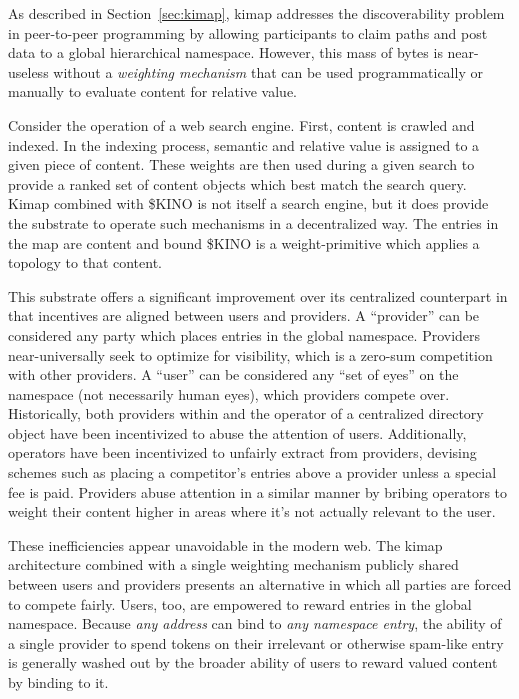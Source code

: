\documentclass[runningheads]{llncs}
\begin{document}
As described in Section~\ref{sec:kimap}, kimap addresses the discoverability problem in peer-to-peer programming by allowing participants to claim paths and post data to a global hierarchical namespace.
However, this mass of bytes is near-useless without a \textit{weighting mechanism} that can be used programmatically or manually to evaluate content for relative value.

Consider the operation of a web search engine.
First, content is crawled and indexed.
In the indexing process, semantic and relative value is assigned to a given piece of content.
These weights are then used during a given search to provide a ranked set of content objects which best match the search query.
Kimap combined with \$KINO is not itself a search engine, but it does provide the substrate to operate such mechanisms in a decentralized way.
The entries in the map are content and bound \$KINO is a weight-primitive which applies a topology to that content.

This substrate offers a significant improvement over its centralized counterpart in that incentives are aligned between users and providers.
A ``provider'' can be considered any party which places entries in the global namespace.
Providers near-universally seek to optimize for visibility, which is a zero-sum competition with other providers.
A ``user'' can be considered any ``set of eyes'' on the namespace (not necessarily human eyes), which providers compete over.
Historically, both providers within and the operator of a centralized directory object have been incentivized to abuse the attention of users.
Additionally, operators have been incentivized to unfairly extract from providers, devising schemes such as placing a competitor's entries above a provider unless a special fee is paid.
Providers abuse attention in a similar manner by bribing operators to weight their content higher in areas where it's not actually relevant to the user.

These inefficiencies appear unavoidable in the modern web.
The kimap architecture combined with a single weighting mechanism publicly shared between users and providers presents an alternative in which all parties are forced to compete fairly.
Users, too, are empowered to reward entries in the global namespace.
Because \textit{any address} can bind to \textit{any namespace entry}, the ability of a single provider to spend tokens on their irrelevant or otherwise spam-like entry is generally washed out by the broader ability of users to reward valued content by binding to it.
\end{document}

